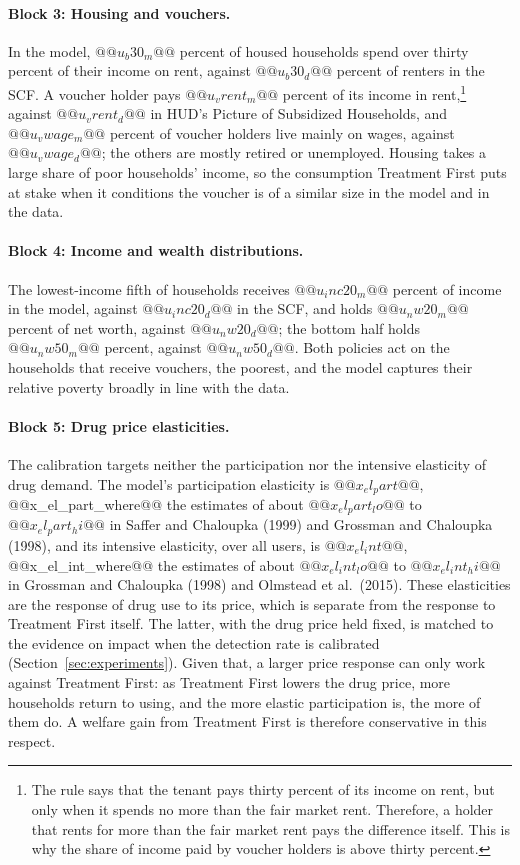 \documentclass[10pt]{article}
\begin{document}
\paragraph{Block 3: Housing and vouchers.} In the model, $@@u_b30_m@@$ percent of housed households spend over thirty percent of their income on rent, against $@@u_b30_d@@$ percent of renters in the SCF. A voucher holder pays $@@u_vrent_m@@$ percent of its income in rent,\footnote{ The rule says that the tenant pays thirty percent of its income on rent, but only when it spends no more than the fair market rent. Therefore, a holder that rents for more than the fair market rent pays the difference itself. This is why the share of income paid by voucher holders is above thirty percent.} against $@@u_vrent_d@@$ in HUD's Picture of Subsidized Households, and $@@u_vwage_m@@$ percent of voucher holders live mainly on wages, against $@@u_vwage_d@@$; the others are mostly retired or unemployed. Housing takes a large share of poor households' income, so the consumption Treatment First puts at stake when it conditions the voucher is of a similar size in the model and in the data.

\paragraph{Block 4: Income and wealth distributions.} The lowest-income fifth of households receives $@@u_inc20_m@@$ percent of income in the model, against $@@u_inc20_d@@$ in the SCF, and holds $@@u_nw20_m@@$ percent of net worth, against $@@u_nw20_d@@$; the bottom half holds $@@u_nw50_m@@$ percent, against $@@u_nw50_d@@$. Both policies act on the households that receive vouchers, the poorest, and the model captures their relative poverty broadly in line with the data.

\paragraph{Block 5: Drug price elasticities.} The calibration targets neither the participation nor the intensive elasticity of drug demand. The model's participation elasticity is $@@x_el_part@@$, @@x_el_part_where@@ the estimates of about $@@x_el_part_lo@@$ to $@@x_el_part_hi@@$ in Saffer and Chaloupka (1999) and Grossman and Chaloupka (1998), and its intensive elasticity, over all users, is $@@x_el_int@@$, @@x_el_int_where@@ the estimates of about $@@x_el_int_lo@@$ to $@@x_el_int_hi@@$ in Grossman and Chaloupka (1998) and Olmstead et al.\ (2015). These elasticities are the response of drug use to its price, which is separate from the response to Treatment First itself. The latter, with the drug price held fixed, is matched to the evidence on impact when the detection rate is calibrated (Section~\ref{sec:experiments}). Given that, a larger price response can only work against Treatment First: as Treatment First lowers the drug price, more households return to using, and the more elastic participation is, the more of them do. A welfare gain from Treatment First is therefore conservative in this respect.
\end{document}
